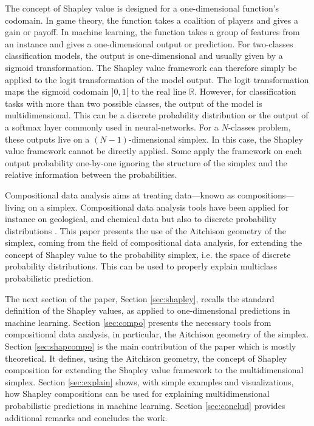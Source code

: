 \documentclass{article}
\theoremstyle{plain}
\theoremstyle{definition}
\theoremstyle{remark}
\begin{document}
The concept of Shapley value is designed for a one-dimensional function's codomain. In game theory, the function takes a coalition of players and gives a gain or payoff. In machine learning, the function takes a group of features from an instance and gives a one-dimensional output or prediction. For two-classes classification models, the output is one-dimensional and usually given by a sigmoid transformation. The Shapley value framework can therefore simply be applied to the logit transformation of the model output. The logit transformation maps the sigmoid codomain $]0,1[$ to the real line $\mathbb{R}$. However, for classification tasks with more than two possible classes, the output of the model is multidimensional. This can be a discrete probability distribution or the output of a softmax layer commonly used in neural-networks. For a $N$-classes problem, these outputs live on a $(N-1)$-dimensional simplex. In this case, the Shapley value framework cannot be directly applied. Some apply the framework on each output probability one-by-one ignoring the structure of the simplex and the relative information between the probabilities.

Compositional data analysis \cite{aitchison1982,pawlowskymodeling} aims at treating data---known as compositions---living on a simplex. Compositional data analysis tools have been applied for instance on geological, and chemical data but also to discrete probability distributions \cite{egozcue2011evidence,egozcue2018evidence,noe2023representing}. This paper presents the use of the Aitchison geometry of the simplex, coming from the field of compositional data analysis, for extending the concept of Shapley value to the probability simplex, i.e. the space of discrete probability distributions. This can be used to properly explain multiclass probabilistic prediction.

The next section of the paper, Section \ref{sec:shapley}, recalls the standard definition of the Shapley values, as applied to one-dimensional predictions in machine learning. Section \ref{sec:compo} presents the necessary tools from compositional data analysis, in particular, the Aitchison geometry of the simplex. Section \ref{sec:shapcompo} is the main contribution of the paper which is mostly theoretical. It defines, using the Aitchison geometry, the concept of Shapley composition for extending the Shapley value framework to the multidimensional simplex. Section \ref{sec:explain} shows, with simple examples and visualizations, how Shapley compositions can be used for explaining multidimensional probabilistic predictions in machine learning. Section \ref{sec:conclud} provides additional remarks and concludes the work.
\end{document}
